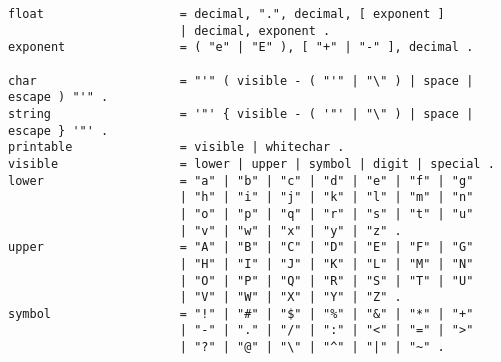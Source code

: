 \documentclass[a4paper, article, oneside, 10pt]{memoir}
\begin{document}
\begin{verbatim}
float                   = decimal, ".", decimal, [ exponent ]
                        | decimal, exponent .
exponent                = ( "e" | "E" ), [ "+" | "-" ], decimal .

char                    = "'" ( visible - ( "'" | "\" ) | space | escape ) "'" .
string                  = '"' { visible - ( '"' | "\" ) | space | escape } '"' .
printable               = visible | whitechar .
visible                 = lower | upper | symbol | digit | special .
lower                   = "a" | "b" | "c" | "d" | "e" | "f" | "g"
                        | "h" | "i" | "j" | "k" | "l" | "m" | "n"
                        | "o" | "p" | "q" | "r" | "s" | "t" | "u"
                        | "v" | "w" | "x" | "y" | "z" .
upper                   = "A" | "B" | "C" | "D" | "E" | "F" | "G"
                        | "H" | "I" | "J" | "K" | "L" | "M" | "N"
                        | "O" | "P" | "Q" | "R" | "S" | "T" | "U"
                        | "V" | "W" | "X" | "Y" | "Z" .
symbol                  = "!" | "#" | "$" | "%" | "&" | "*" | "+"
                        | "-" | "." | "/" | ":" | "<" | "=" | ">"
                        | "?" | "@" | "\" | "^" | "|" | "~" .
\end{verbatim}
\end{document}
